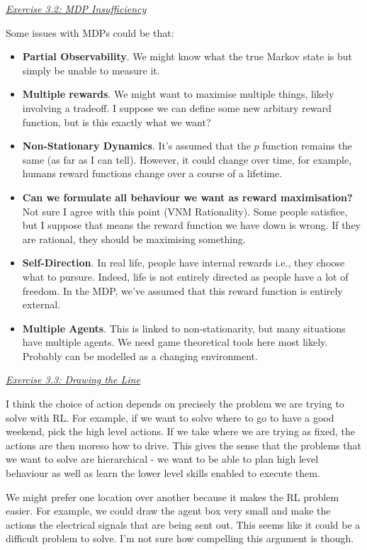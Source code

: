 \documentclass{article}
\newcommand{\myq}[1]{%
	\vspace{1em}
	\noindent\underline{\emph{Exercise #1}}\vspace{0.25em}\linebreak
}
\begin{document}
\myq{3.2: MDP Insufficiency}
Some issues with MDPs could be that:
\begin{itemize}
	\item \textbf{Partial Observability}. We might know what the true Markov state is but simply be unable to measure it. 
	\item \textbf{Multiple rewards}. We might want to maximise multiple things, likely involving a tradeoff. I suppose we can define some new arbitary reward function, but is this exactly what we want?
	\item \textbf{Non-Stationary Dynamics}. It's assumed that the $p$ function remains the same (as far as I can tell). However, it could change over time, for example, humans reward functions change over a course of a lifetime.
	\item \textbf{Can we formulate all behaviour we want as reward maximisation?} Not sure I agree with this point (VNM Rationality). Some people satisfice, but I suppose that means the reward function we have down is wrong. If they are rational, they should be maximising something. 
	\item \textbf{Self-Direction}. In real life, people have internal rewards i.e., they choose what to pursure. Indeed, life is not entirely directed as people have a lot of freedom. In the MDP, we've assumed that this reward function is entirely external. 
	\item \textbf{Multiple Agents}. This is linked to non-stationarity, but many situations have multiple agents. We need game theoretical tools here most likely. Probably can be modelled as a changing environment. 
\end{itemize}

\myq{3.3: Drawing the Line}
I think the choice of action depends on precisely the problem we are trying to solve with RL. For example, if we want to solve where to go to have a good weekend, pick the high level actions. If we take where we are trying as fixed, the actions are then moreso how to drive. This gives the sense that the problems that we want to solve are hierarchical - we want to be able to plan high level behaviour as well as learn the lower level skills enabled to execute them.

We might prefer one location over another because it makes the RL problem easier. For example, we could draw the agent box very small and make the actions the electrical signals that are being sent out. This seems like it could be a difficult problem to solve. I'm not sure how compelling this argument is though. 
\end{document}
